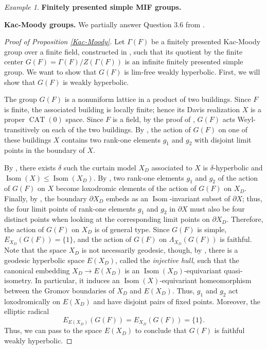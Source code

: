 \documentclass[11pt,letterpaper]{article}
\DeclareMathOperator{\Isom}{Isom}
\DeclareMathOperator{\CAT}{CAT}
\theoremstyle{definition}
\theoremstyle{remark}
\newtheorem{ex}[thm]{Example}
\begin{document}
\begin{ex} 
{\bf Finitely presented simple MIF groups.}\label{ex BM}
\end{ex}
{\bf Kac-Moody groups.} We partially answer Question 3.6 from \cite{BFFHZ}.

\begin{proof}[Proof of Proposition \ref{Kac-Moody}]
    Let $\Gamma(F)$ be a finitely presented Kac-Moody group over a finite field, constructed in \cite{CR}, such that its quotient by the finite center $G(F)=\Gamma(F)/Z(\Gamma(F))$ is an infinite finitely presented simple group. We want to show that $G(F)$ is lim-free weakly hyperbolic. First, we will show that $G(F)$ is weakly hyperbolic.

    The group $G(F)$ is a nonuniform lattice in a product of two buildings.  Since $F$ is finite, the associated building is locally finite; hence its Davis realization $X$ is a proper $\CAT(0)$ space. Since $F$ is a field, by the proof of \cite[Corollary 1.3 (page 19, line 1 of the proof)]{CF}, $G(F)$ acts Weyl-transitively on each of the two buildings.
    By \cite[Proposition 5.3]{CF}, the action of $G(F)$ on one of these buildings $X$ contains two rank-one elements $g_1$ and $g_2$ with disjoint limit points in the boundary of $X$. 

    By \cite[Theorem B]{PSZ}, there exists $\delta$ such the curtain model $X_D$ associated to $X$ is $\delta$-hyperbolic and $\Isom(X) \leq \Isom(X_D)$. By \cite[Theorem C]{PSZ}, two rank-one elements $g_1$ and $g_2$ of the action of $G(F)$ on $X$ become loxodromic elements of the action of $G(F)$ on $X_D$. Finally, by \cite[Theorem L]{PSZ}, the boundary $\partial X_D$ embeds as an $\Isom$-invariant subset of $\partial X$; thus, the four limit points of rank-one elements $g_1$ and $g_2$ in $\partial X$ must also be four distinct points when looking at the corresponding limit points on $\partial X_D$. Therefore, the action of $G(F)$ on $X_D$ is of general type. Since $G(F)$ is simple, $E_{X_D}(G(F))= \{1\}$, and the action of $G(F)$ on $\Lambda_{X_D}(G(F))$ is faithful. Note that the space $X_D$ is not necessarily geodesic, though, by \cite[Proposition N]{PSZ}, there is a geodesic hyperbolic space $E(X_D)$, called the {\it injective hull}, such that the canonical embedding $X_D \rightarrow E(X_D)$ is an $\Isom(X_D)$-equivariant quasi-isometry. In particular, it induces an $\Isom(X)$-equivariant homeomorphism between the Gromov boundaries of $X_D$ and $E(X_D)$. Thus, $g_1$ and $g_2$ act loxodromically on $E(X_D)$ and have disjoint pairs of fixed points. Moreover, the elliptic radical
$$
E_{E(X_D)}(G(F))=E_{X_D}(G(F))=\{1\}.
$$
Thus, we can pass to the space $E(X_D)$ to conclude that $G(F)$ is faithful weakly hyperbolic.


\end{proof}
\end{document}
